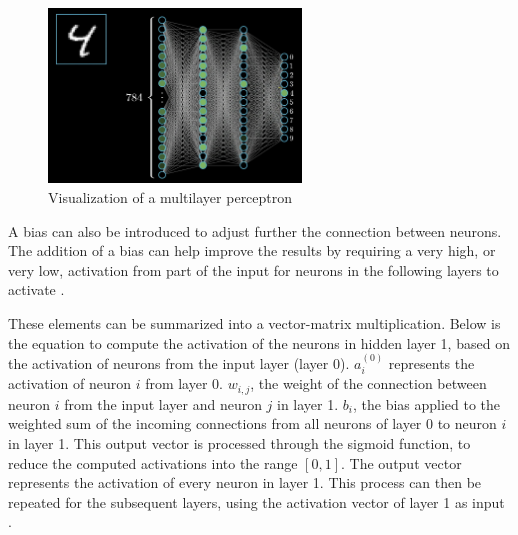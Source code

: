 ﻿\documentclass[12pt,a4paper,notitlepage]{article}
\begin{document}
\begin{figure}[htbp]
 \centering
  \includegraphics[width=0.60\textwidth]{images/perceptron-visualisation.png}
 \caption{Visualization of a multilayer perceptron \cite{sanderson_gradient_2017}}
 \label{fig:perceptron-visualisation}
\end{figure}

A bias can also be introduced to adjust further the connection between neurons. The addition of a bias can help improve the results by requiring a very high, or very low, activation from part of the input for neurons in the following layers to activate \cite{sanderson_but_2017}.

These elements can be summarized into a vector-matrix multiplication. Below is the equation to compute the activation of the neurons in hidden layer 1, based on the activation of neurons from the input layer (layer 0). \(a_i^{(0)}\) represents the activation of neuron \(i\) from layer 0. \(w_{i,j}\), the weight of the connection between neuron \(i\) from the input layer and neuron \(j\) in layer 1. \(b_i\), the bias applied to the weighted sum of the incoming connections from all neurons of layer 0 to neuron \(i\) in layer 1. This output vector is processed through the sigmoid function, to reduce the computed activations into the range \([0,1]\). The output vector represents the activation of every neuron in layer 1. This process can then be repeated for the subsequent layers, using the activation vector of layer 1 as input \cite{sanderson_but_2017}.
\end{document}
